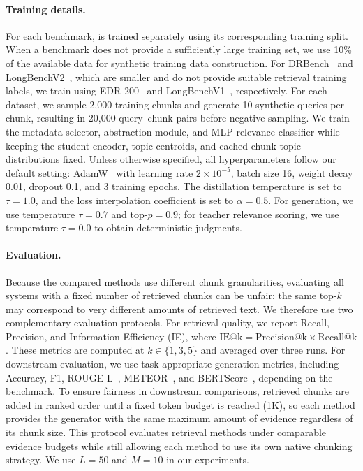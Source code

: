 \paragraph{Training details.}
For each benchmark, \name{} is trained separately using its corresponding training split. When a benchmark does not provide a sufficiently large training set, we use 10\% of the available data for synthetic training data construction. For DRBench~\cite{abaskohi2026drbench} and LongBenchV2~\cite{bai-etal-2025-longbench}, which are smaller and do not provide suitable retrieval training labels, we train using EDR-200~\cite{prabhakar2025enterprisedeepresearchsteerable} and LongBenchV1~\cite{bai-etal-2024-longbench}, respectively. For each dataset, we sample 2{,}000 training chunks and generate 10 synthetic queries per chunk, resulting in 20{,}000 query--chunk pairs before negative sampling. We train the metadata selector, abstraction module, and MLP relevance classifier while keeping the student encoder, topic centroids, and cached chunk-topic distributions fixed. Unless otherwise specified, all hyperparameters follow our default setting: AdamW~\cite{loshchilov2018decoupled} with learning rate $2\times10^{-5}$, batch size 16, weight decay 0.01, dropout 0.1, and 3 training epochs. The distillation temperature is set to $\tau=1.0$, and the loss interpolation coefficient is set to $\alpha=0.5$. For generation, we use temperature $\tau=0.7$ and top-$p=0.9$; for teacher relevance scoring, we use temperature $\tau=0.0$ to obtain deterministic judgments.

\paragraph{Evaluation.}
Because the compared methods use different chunk granularities, evaluating all systems with a fixed number of retrieved chunks can be unfair: the same top-$k$ may correspond to very different amounts of retrieved text. We therefore use two complementary evaluation protocols. For retrieval quality, we report Recall, Precision, and Information Efficiency (IE), where $\mathrm{IE@k}=\mathrm{Precision@k}\times\mathrm{Recall@k}$. These metrics are computed at $k \in \{1,3,5\}$ and averaged over three runs. For downstream evaluation, we use task-appropriate generation metrics, including Accuracy, F1, ROUGE-L~\cite{lin-2004-rouge}, METEOR~\cite{banerjee-lavie-2005-meteor}, and BERTScore~\cite{Zhang2020BERTScore}, depending on the benchmark. To ensure fairness in downstream comparisons, retrieved chunks are added in ranked order until a fixed token budget is reached (1K), so each method provides the generator with the same maximum amount of evidence regardless of its chunk size. This protocol evaluates retrieval methods under comparable evidence budgets while still allowing each method to use its own native chunking strategy. We use $L=50$ and $M=10$ in our experiments.